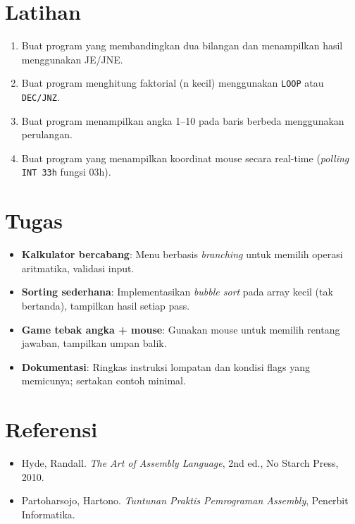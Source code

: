 \section{Latihan}
\begin{enumerate}
  \item Buat program yang membandingkan dua bilangan dan menampilkan hasil menggunakan JE/JNE.
  \item Buat program menghitung faktorial (n kecil) menggunakan \texttt{LOOP} atau \texttt{DEC/JNZ}.
  \item Buat program menampilkan angka 1--10 pada baris berbeda menggunakan perulangan.
  \item Buat program yang menampilkan koordinat mouse secara real-time (\textit{polling} \texttt{INT 33h} fungsi 03h).
\end{enumerate}

\section{Tugas}
\begin{itemize}
  \item \textbf{Kalkulator bercabang}: Menu berbasis \textit{branching} untuk memilih operasi aritmatika, validasi input.
  \item \textbf{Sorting sederhana}: Implementasikan \textit{bubble sort} pada array kecil (tak bertanda), tampilkan hasil setiap pass.
  \item \textbf{Game tebak angka + mouse}: Gunakan mouse untuk memilih rentang jawaban, tampilkan umpan balik.
  \item \textbf{Dokumentasi}: Ringkas instruksi lompatan dan kondisi flags yang memicunya; sertakan contoh minimal.
\end{itemize}

\section{Referensi}
\begin{itemize}
  \item Hyde, Randall. \textit{The Art of Assembly Language}, 2nd ed., No Starch Press, 2010.
  \item Partoharsojo, Hartono. \textit{Tuntunan Praktis Pemrograman Assembly}, Penerbit Informatika.
\end{itemize}
